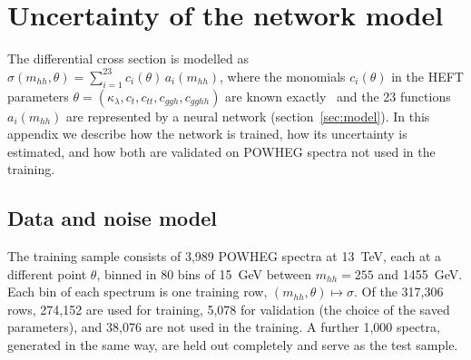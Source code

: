 \section{Uncertainty of the network model}
\label{app:uncertainty}

The differential cross section is modelled as
$\sigma(m_{hh},\theta) = \sum_{i=1}^{23} c_i(\theta)\, a_i(m_{hh})$, where the
monomials $c_i(\theta)$ in the HEFT parameters
$\theta = (\kappa_\lambda, c_t, c_{tt}, c_{ggh}, c_{gghh})$ are known
exactly~\cite{Alasfar:2023xpc} and the 23 functions $a_i(m_{hh})$ are represented by a
neural network (section~\ref{sec:model}). %
In this appendix we describe how the network is trained, how its uncertainty is
estimated, and how both are validated on POWHEG spectra not used in the training.

\subsection{Data and noise model}
\label{app:data}

The training sample consists of 3,989 POWHEG spectra at 13~TeV, each at a different point
$\theta$, binned in 80 bins of 15~GeV between $m_{hh} = 255$ and 1455~GeV. Each bin of
each spectrum is one training row, $(m_{hh}, \theta) \mapsto \sigma$. Of the 317,306 rows,
274,152 are used for training, 5,078 for validation (the choice of the saved parameters),
and 38,076 are not used in the training. A further 1,000 spectra, generated in the same
way, are held out completely and serve as the test sample.

